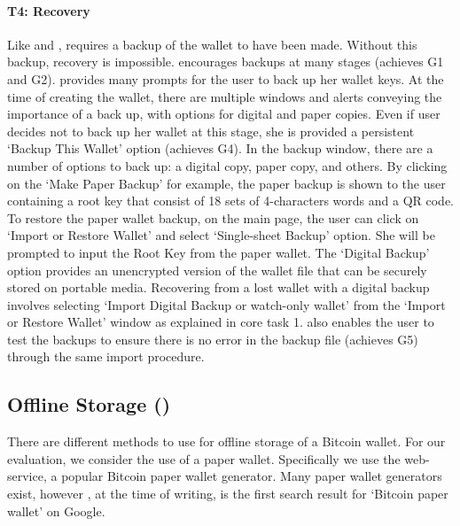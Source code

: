 \paragraph{T4: Recovery} Like \Bitcoinclient and \multibit, \armory requires a backup of the wallet to have been made. Without this backup, recovery is impossible. \armory encourages backups at many stages (achieves G1 and G2). \armory provides many prompts for the user to back up her wallet keys. At the time of creating the wallet, there are multiple windows and alerts conveying the importance of a back up, with options for digital and paper copies. Even if user decides not to back up her wallet at this stage, she is provided a persistent `Backup This Wallet' option (achieves G4). In the backup window, there are a number of options to back up: a digital copy, paper copy, and others. By clicking on the `Make Paper Backup' for example, the paper backup is shown to the user containing a root key that consist of 18 sets of 4-characters words and a QR code. To restore the paper wallet backup, on the main page, the user can click on `Import or Restore Wallet' and select `Single-sheet Backup' option. She will be prompted to input the Root Key from the paper wallet. The `Digital Backup' option provides an unencrypted version of the wallet file that can be securely stored on portable media. Recovering from a lost wallet with a digital backup involves selecting `Import Digital Backup or watch-only wallet' from the `Import or Restore Wallet' window as explained in core task 1. \armory also enables the user to test the backups to ensure there is no error in the backup file (achieves G5) through the same import procedure.

\subsection{Offline Storage (\paper)}
There are different methods to use for offline storage of a Bitcoin wallet. For our evaluation, we consider the use of a paper wallet. Specifically we use the \paper web-service, a popular Bitcoin paper wallet generator. Many paper wallet generators exist, however \paper, at the time of writing, is the first search result for `Bitcoin paper wallet' on Google.

